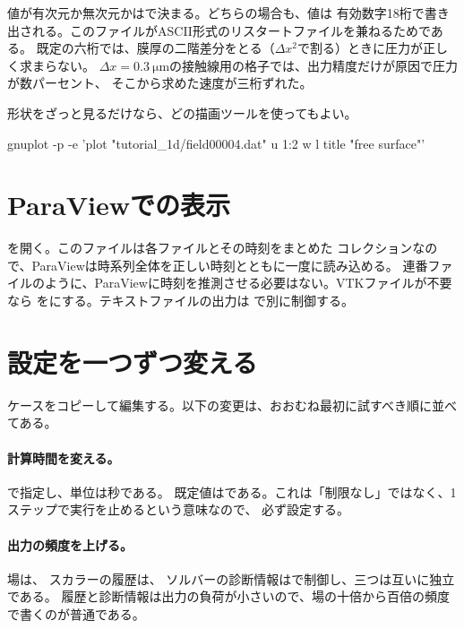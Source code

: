 値が有次元か無次元かはで決まる。どちらの場合も、値は
有効数字18桁で書き出される。このファイルがASCII形式のリスタートファイルを兼ねるためである。
既定の六桁では、膜厚の二階差分をとる（$\Delta x^2$で割る）ときに圧力が正しく求まらない。
$\Delta x = \SI{0.3}{\micro\metre}$の接触線用の格子では、出力精度だけが原因で圧力が数パーセント、
そこから求めた速度が三桁ずれた。

形状をざっと見るだけなら、どの描画ツールを使ってもよい。

\begin{shell}
gnuplot -p -e 'plot "tutorial_1d/field00004.dat" u 1:2 w l title "free surface"'
\end{shell}

\section{ParaViewでの表示}
\label{sec:firstrun:paraview}

を開く。このファイルは各ファイルとその時刻をまとめた
コレクションなので、ParaViewは時系列全体を正しい時刻とともに一度に読み込める。
連番ファイルのように、ParaViewに時刻を推測させる必要はない。VTKファイルが不要なら
をにする。テキストファイルの出力は
で別に制御する。

\section{設定を一つずつ変える}
\label{sec:firstrun:changing}

ケースをコピーして編集する。以下の変更は、おおむね最初に試すべき順に並べてある。

\paragraph{計算時間を変える。} で指定し、単位は秒である。
既定値はである。これは「制限なし」ではなく、1ステップで実行を止めるという意味なので、
必ず設定する。

\paragraph{出力の頻度を上げる。} 場は、
スカラーの履歴は、
ソルバーの診断情報はで制御し、三つは互いに独立である。
履歴と診断情報は出力の負荷が小さいので、場の十倍から百倍の頻度で書くのが普通である。

